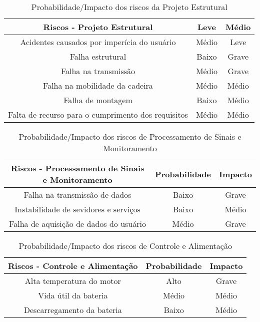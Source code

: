 \begin{table}[h]
\centering
\vspace{0.5cm}
\begin{tabular}{|c|c|c|}
\hline
Riscos - Projeto Estrutural    & Leve            & Médio          \\
\hline
Acidentes causados por imperícia do usuário         & Médio & Leve \\
Falha estrutural                                    & Baixo & Grave \\
Falha na transmissão                                & Médio & Grave \\
Falha na mobilidade da cadeira                      & Médio & Médio \\
Falha de montagem                                   & Baixo & Médio \\
Falta de recurso para o cumprimento dos requisitos  & Médio & Médio \\
\hline
\end{tabular}
\caption{Probabilidade/Impacto dos riscos da Projeto Estrutural}
\label{tab:probimpest}
\end{table}

\begin{table}[h]
\centering
\vspace{0.5cm}
\begin{tabular}{|c|c|c|}
\hline
Riscos - Processamento de Sinais e Monitoramento       & Probabilidade & Impacto \\
\hline
Falha na transmissão de dados           & Baixo         & Grave \\
Instabilidade de sevidores e serviços   & Baixo         & Médio \\
Falha de aquisição de dados do usuário  & Médio         & Grave \\
\hline
\end{tabular}
\caption{Probabilidade/Impacto dos riscos de Processamento de Sinais e Monitoramento}
\label{tab:probimpcontrole}
\end{table}

\begin{table}[h]
\centering
\vspace{0.5cm}
\begin{tabular}{|c|c|c|}
\hline
Riscos - Controle e Alimentação        & Probabilidade & Impacto \\
\hline
Alta temperatura do motor   & Alto          & Grave \\
Vida útil da bateria        & Médio         & Médio \\
Descarregamento da bateria  & Baixo         & Médio \\
\hline
\end{tabular}
\caption{Probabilidade/Impacto dos riscos de Controle e Alimentação}
\label{tab:probimpalim}
\end{table}

